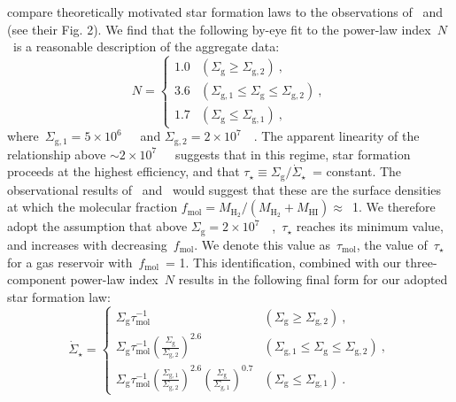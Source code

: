 \documentclass[draft2.tex]{subfiles}
\begin{document}
\citet{Krumholz2018a} compare theoretically motivated star formation laws to 
the observations of~\citet{Bigiel2010} and~\citet{Leroy2013} (see their Fig. 2). 
We find that the following by-eye fit to the power-law index~$N$~is a 
reasonable description of the aggregate data: 
\begin{equation} 
N = \begin{cases} 
1.0 & (\Sigma_\text{g} \geq \Sigma_{\text{g},2})~, \\ 
3.6 & (\Sigma_{\text{g},1} \leq \Sigma_\text{g} \leq \Sigma_{\text{g},2})~, \\ 
1.7 & (\Sigma_\text{g} \leq \Sigma_{\text{g},1})~, 
\end{cases} 
\label{eq:sf_law_indeces} 
\end{equation} 
where~$\Sigma_{\text{g},1} = 5\times10^6$~\msun~\persqkpc~and 
$\Sigma_{\text{g},2} = 2\times10^7$~\msun~\persqkpc. 
The apparent linearity of the relationship above 
$\sim2\times10^7$~\msun~\persqkpc~suggests that in this regime, star formation 
proceeds at the highest efficiency, and that 
$\tau_\star \equiv \Sigma_\text{g}/\dot{\Sigma}_\star$~= constant. 
The observational results of~\citet{Leroy2013} and~\citet{Kennicutt2021} would 
suggest that these are the surface densities at which the molecular fraction 
$f_\text{mol} = M_{\text{H}_2} / (M_{\text{H}_2} + M_\text{HI}) \approx$~1. 
We therefore adopt the assumption that above 
$\Sigma_\text{g} = 2\times10^7$~\msun~\persqkpc,~$\tau_\star$ reaches its 
minimum value, and increases with decreasing~$f_\text{mol}$. 
We denote this value as~$\tau_\text{mol}$, the value of~$\tau_\star$ for a gas 
reservoir with~$f_\text{mol}$~= 1. 
This identification, combined with our three-component power-law index~$N$ 
results in the following final form for our adopted star formation law: 
\begin{equation} 
\dot{\Sigma}_\star = \begin{cases} 
\Sigma_\text{g} \tau_\text{mol}^{-1} & 
(\Sigma_\text{g} \geq \Sigma_{\text{g},2})~, 
\\ 
\Sigma_\text{g} \tau_\text{mol}^{-1} \left(\frac{
	\Sigma_\text{g}
}{
	\Sigma_{\text{g},2} 
}\right)^{2.6} & 
(\Sigma_{\text{g},1} \leq \Sigma_\text{g} \leq \Sigma_{\text{g},2})~, 
\\ 
\Sigma_\text{g} \tau_\text{mol}^{-1} \left(\frac{
	\Sigma_{\text{g},1} 
}{
	\Sigma_{\text{g},2} 
}\right)^{2.6}\left(\frac{
	\Sigma_\text{g}
}{
	\Sigma_{\text{g},1} 
}\right)^{0.7} & 
(\Sigma_\text{g} \leq \Sigma_{\text{g},1})~. 
\end{cases} 
\label{eq:sf_law} 
\end{equation} 
\end{document}
